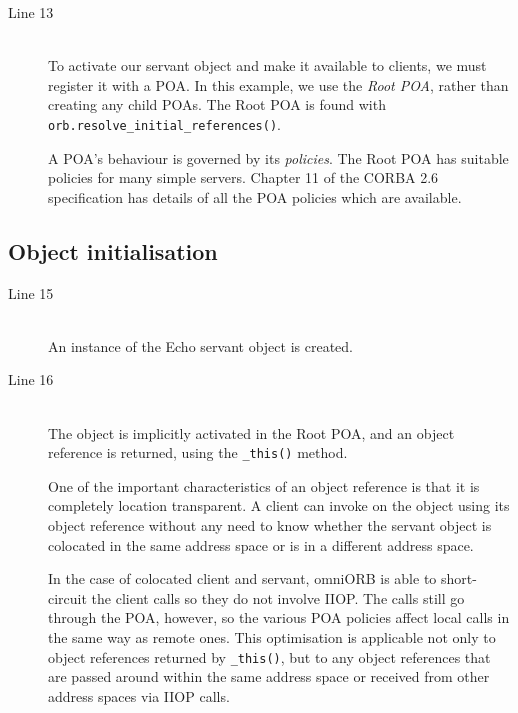 \documentclass[11pt,oneside,a4paper]{book}
\newcommand{\op}[1]{\texttt{#1()}}
\newcommand{\term}[1]{\textit{#1}}
\newcommand{\dsc}{\discretionary{}{}{}}
\begin{document}
\begin{description}

\item[Line 13]\mbox{}\\
%
To activate our servant object and make it available to clients, we
must register it with a POA. In this example, we use the \term{Root
POA}, rather than creating any child POAs. The Root POA is found with
\op{orb.resolve\_initial\_\dsc{}references}.

A POA's behaviour is governed by its \term{policies}. The Root POA has
suitable policies for many simple servers. Chapter 11 of the CORBA 2.6
specification \cite{corba26-spec} has details of all the POA policies
which are available.

\end{description}


\subsection{Object initialisation}

\begin{description}

\item[Line 15]\mbox{}\\
%
An instance of the Echo servant object is created.

\item[Line 16]\mbox{}\\
%
The object is implicitly activated in the Root POA, and an object
reference is returned, using the \op{\_this} method.

One of the important characteristics of an object reference is that it
is completely location transparent. A client can invoke on the object
using its object reference without any need to know whether the
servant object is colocated in the same address space or is in a
different address space.

In the case of colocated client and servant, omniORB is able to
short-circuit the client calls so they do not involve IIOP. The calls
still go through the POA, however, so the various POA policies affect
local calls in the same way as remote ones. This optimisation is
applicable not only to object references returned by \op{\_this}, but
to any object references that are passed around within the same
address space or received from other address spaces via IIOP calls.

\end{description}
\end{document}

